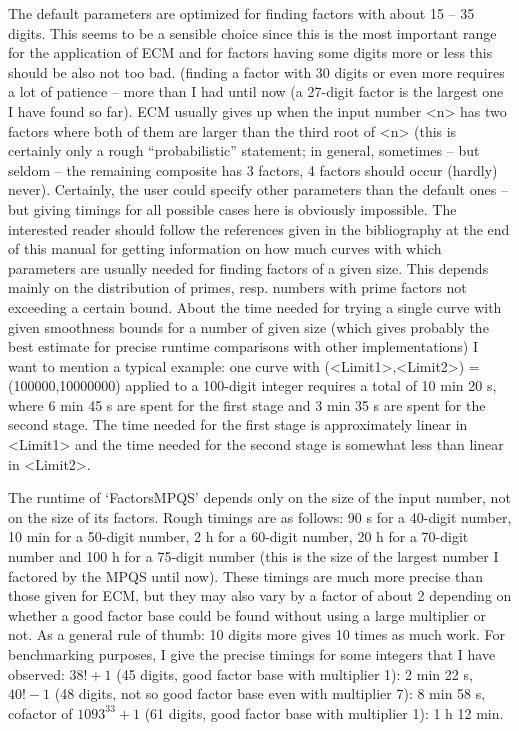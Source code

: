 The default parameters are optimized for finding factors with about
15 -- 35 digits. This seems to be a sensible choice since this is the
most important range for the application of ECM and for factors
having some digits more or less this should be also not too bad.
(finding a factor with 30 digits or even more requires a lot of
patience -- more than I had until now (a 27-digit factor is the largest
one I have found so far).
ECM usually gives up when the input number <n> has two factors where 
both of them are larger than the third root of <n> (this is certainly
only a rough ``probabilistic'' statement; in general, sometimes 
-- but seldom -- the remaining composite has 3 factors, 4 factors
should occur (hardly) never). 
Certainly, the user could specify other parameters than 
the default ones -- but giving timings for all possible cases here is
obviously impossible. The interested reader should follow the references
given in the bibliography at the end of this manual for getting
information on how much curves with which parameters are usually 
needed for finding factors of a given size. This depends mainly on the
distribution of primes, resp. numbers with prime factors not exceeding a
certain bound.
About the time needed for trying a single curve with given smoothness
bounds for a number of given size (which gives probably the best estimate
for precise runtime comparisons with other implementations) I want to
mention a typical example: one curve with (<Limit1>,<Limit2>) =
(100000,10000000) applied to a 100-digit integer requires a total of
10 min 20 s, where 6 min 45 s are spent for the first stage
and 3 min 35 s are spent for the second stage.
The time needed for the first stage is approximately linear in <Limit1>
and the time needed for the second stage is somewhat less than linear
in <Limit2>.


The runtime of `FactorsMPQS' depends only on the size of the input
number, not on the size of its factors.
Rough timings are as follows: 90 s for a 40-digit number, 10 min for a
50-digit number, 2 h for a 60-digit number, 20 h for a 70-digit
number and 100 h for a 75-digit number (this is the size of the
largest number I factored by the MPQS until now).
These timings are much more precise
than those given for ECM, but they may also vary by a factor of about 2
depending on whether a good factor base could be found without using
a large multiplier or not.
As a general rule of thumb: 10 digits more gives 10 times as much
work. 
For benchmarking purposes, I give the precise timings for some integers
that I have observed: $38! + 1$ (45 digits, good factor base with
multiplier 1): 2 min 22 s, $40! - 1$ (48 digits, not so good factor
base even with multiplier 7): 8 min 58 s, cofactor of $1093^{33}+1$
(61 digits, good factor base with multiplier 1): 1 h 12 min.


